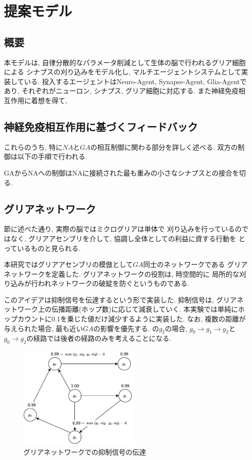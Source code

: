 \documentclass[a4paper,10.5pt,twocolumn]{jsarticle}
\begin{document}
\section{提案モデル}
\subsection{概要}
本モデルは, 自律分散的なパラメータ削減として生体の脳で行われるグリア細胞による
シナプスの刈り込みをモデル化し, マルチエージェントシステムとして実装している.
投入するエージェントはNeuro-Agent, Synapse-Agent, Glia-Agentであり, 
それぞれがニューロン, シナプス, グリア細胞に対応する. 
また神経免疫相互作用に着想を得て, 


\subsection{神経免疫相互作用に基づくフィードバック}
これらのうち, 特に$NA$と$GA$の相互制御に関わる部分を詳しく述べる.
双方の制御は以下の手順で行われる.

GAからNAへの制御はNAに接続された最も重みの小さなシナプスとの接合を切る.
\subsection{グリアネットワーク}
節に述べた通り, 実際の脳ではミクログリアは単体で
刈り込みを行っているのではなく, 
グリアアセンブリを介して, 協調し全体としての利益に資する行動を
とっているものと見られる.

本研究ではグリアアセンブリの模倣として$GA$同士のネットワークである
グリアネットワークを定義した.
グリアネットワークの役割は, 時空間的に
局所的な刈り込みが行われネットワークの破綻を防ぐというものである.

このアイデアは抑制信号を伝達するという形で実装した.
抑制信号は, グリアネットワーク上の伝播距離(ホップ数)に応じて減衰していく.
本実験では単純にホップカウントに0.1を乗じた値だけ減少するように実装した.
なお, 複数の距離が与えられた場合, 最も近い$GA$の影響を優先する.
の$g_2$の場合, 
$g_0\rightarrow g_1\rightarrow g_2$と$g_0\rightarrow g_2$の経路では後者の経路のみを考えることになる.

\begin{figure}[H]
  \centering
  \includegraphics[width=6cm]{GliaNetworks.pdf}
  \caption{グリアネットワークでの抑制信号の伝達}
  \label{fig:GliaNetworks}
\end{figure}
\end{document}
